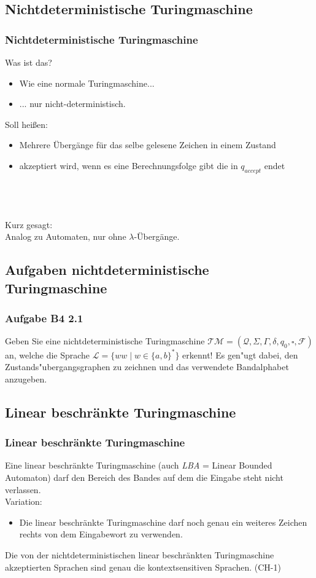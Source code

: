 \subsection{Nichtdeterministische Turingmaschine}
\begin{frame}
	\frametitle{Nichtdeterministische Turingmaschine}
	Was ist das?
	\begin{itemize}
		\item Wie eine normale Turingmaschine...
		\item ... nur nicht-deterministisch.
	\end{itemize}
	Soll heißen:
	\begin{itemize}
		\item Mehrere Übergänge für das selbe gelesene Zeichen in einem Zustand
		\item akzeptiert wird, wenn es eine Berechnungsfolge gibt die in $q_{accept}$ endet
	\end{itemize}
	~\\~\\~\\
	Kurz gesagt:~\\
	Analog zu Automaten, nur ohne $\lambda$-Übergänge.
\end{frame}

\subsection{Aufgaben nichtdeterministische Turingmaschine}
\begin{frame}
\frametitle{Aufgabe B4 2.1}
Geben Sie eine nichtdeterministische Turingmaschine $\mathcal{TM} =
(\mathcal{Q},\Sigma,\Gamma,\delta,q_0,\square,\mathcal{F})$ an, welche die Sprache
$\mathcal{L} = \{ww \; | \; w \in \{a,b\}^*\}$ erkennt! Es gen"ugt dabei, den
Zustands"ubergangsgraphen zu zeichnen und das verwendete Bandalphabet anzugeben.
\end{frame}

\subsection{Linear beschränkte Turingmaschine}
\begin{frame}
	\frametitle{Linear beschränkte Turingmaschine}
	Eine linear beschränkte Turingmaschine (auch \emph{LBA} = Linear Bounded Automaton) darf den Bereich des Bandes auf dem die Eingabe steht nicht verlassen.\\
	\vspace{2mm}
	Variation:
	\begin{itemize}
		\item Die linear beschränkte Turingmaschine darf noch genau ein weiteres Zeichen rechts von dem Eingabewort zu verwenden. 
	\end{itemize}
	\vspace{2mm}
	Die von der nichtdeterministischen linear beschränkten Turingmaschine akzeptierten Sprachen sind genau die kontextsensitiven Sprachen. (CH-1)
\end{frame}

